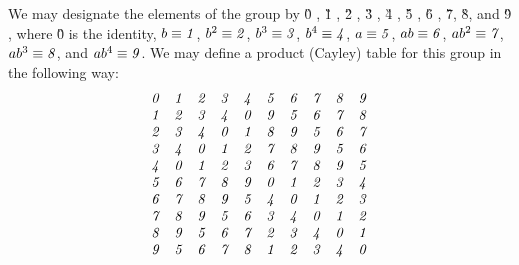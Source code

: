 \documentclass[12pt]{article}
\begin{document}
 We may designate the elements of the group by \G0 , \G1 , \G2 , \G3 , \G4 ,
\G5 , \G6 , \G7, \G8, and \G9 , where \G0 is the identity,
$b \equiv \G1$, $b^2 \equiv \G2$, $b^3 \equiv \G3$, $b^4 \equiv \G4$,
$a \equiv \G5$, $a b \equiv \G6$, $a b^2 \equiv \G7$, $a b^3 \equiv
\G8$, and $a b^4 \equiv \G9$.
We may define a product (Cayley) table for this group in the following way:
\begin{displaymath}
\begin{array}{cccccccccc}
\G0 & \G1 & \G2 & \G3 & \G4 & \G5 & \G6 & \G7 & \G8 & \G9 \\
\G1 & \G2 & \G3 & \G4 & \G0 & \G9 & \G5 & \G6 & \G7 & \G8 \\
\G2 & \G3 & \G4 & \G0 & \G1 & \G8 & \G9 & \G5 & \G6 & \G7 \\
\G3 & \G4 & \G0 & \G1 & \G2 & \G7 & \G8 & \G9 & \G5 & \G6 \\
\G4 & \G0 & \G1 & \G2 & \G3 & \G6 & \G7 & \G8 & \G9 & \G5 \\
\G5 & \G6 & \G7 & \G8 & \G9 & \G0 & \G1 & \G2 & \G3 & \G4 \\
\G6 & \G7 & \G8 & \G9 & \G5 & \G4 & \G0 & \G1 & \G2 & \G3 \\
\G7 & \G8 & \G9 & \G5 & \G6 & \G3 & \G4 & \G0 & \G1 & \G2 \\
\G8 & \G9 & \G5 & \G6 & \G7 & \G2 & \G3 & \G4 & \G0 & \G1 \\
\G9 & \G5 & \G6 & \G7 & \G8 & \G1 & \G2 & \G3 & \G4 & \G0 
\end{array}
\end{displaymath}
\end{document}
